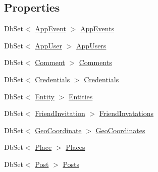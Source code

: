 \subsection*{Properties}
\begin{DoxyCompactItemize}
\item 
Db\+Set$<$ \hyperlink{class_bibabook_1_1_models_1_1_app_event}{App\+Event} $>$ \hyperlink{class_bibabook_1_1_d_a_l_1_1_data_base_context_a19eaad2f6469748fa11cc7d7ae99beaf}{App\+Events}
\item 
Db\+Set$<$ \hyperlink{class_bibabook_1_1_models_1_1_app_user}{App\+User} $>$ \hyperlink{class_bibabook_1_1_d_a_l_1_1_data_base_context_ad407231ab1c907862f3867d860489275}{App\+Users}
\item 
Db\+Set$<$ \hyperlink{class_bibabook_1_1_models_1_1_comment}{Comment} $>$ \hyperlink{class_bibabook_1_1_d_a_l_1_1_data_base_context_a2ba7b902ac7f6e9acd93754983beb640}{Comments}
\item 
Db\+Set$<$ \hyperlink{class_bibabook_1_1_models_1_1_credentials}{Credentials} $>$ \hyperlink{class_bibabook_1_1_d_a_l_1_1_data_base_context_af407a7eff73692836fff327dbb32c7bd}{Credentials}
\item 
Db\+Set$<$ \hyperlink{class_bibabook_1_1_models_1_1_entity}{Entity} $>$ \hyperlink{class_bibabook_1_1_d_a_l_1_1_data_base_context_a6ec1c6695589c0a7c73e892ac60aa9ab}{Entities}
\item 
Db\+Set$<$ \hyperlink{class_bibabook_1_1_models_1_1_friend_invitation}{Friend\+Invitation} $>$ \hyperlink{class_bibabook_1_1_d_a_l_1_1_data_base_context_a8ebfa42d4befe3a686bd47d20eeea206}{Friend\+Invatations}
\item 
Db\+Set$<$ \hyperlink{class_bibabook_1_1_models_1_1_geo_coordinate}{Geo\+Coordinate} $>$ \hyperlink{class_bibabook_1_1_d_a_l_1_1_data_base_context_aff26be11ddd0dc96675b750e701ba1b2}{Geo\+Coordinates}
\item 
Db\+Set$<$ \hyperlink{class_bibabook_1_1_models_1_1_place}{Place} $>$ \hyperlink{class_bibabook_1_1_d_a_l_1_1_data_base_context_ae422d8e897c183f9913ae6bd3a863e9e}{Places}
\item 
Db\+Set$<$ \hyperlink{class_bibabook_1_1_models_1_1_post}{Post} $>$ \hyperlink{class_bibabook_1_1_d_a_l_1_1_data_base_context_ab3f78c1cbb963e45175b4509016d3bad}{Posts}
\end{DoxyCompactItemize}


